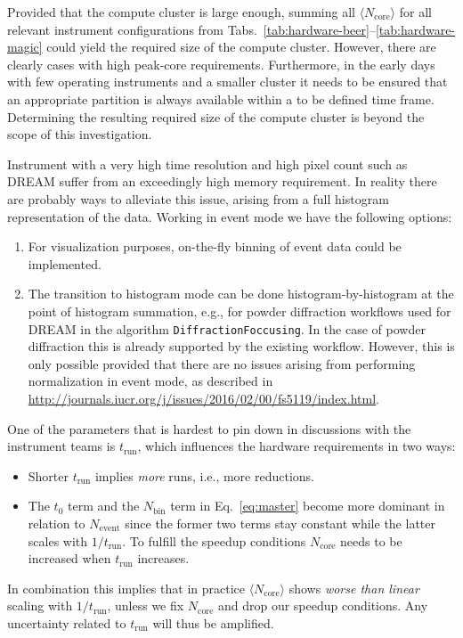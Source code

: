 \documentclass[a4paper,english,numbers=noenddot,bibliography=totoc,chapterprefix=on,DIV=12]{scrartcl}
\newcommand{\Trun}{t_{\text{run}}}
\newcommand{\Nbin}{N_{\text{bin}}}
\newcommand{\Ncore}{N_{\text{core}}}
\newcommand{\Ncoremean}{\langle N_{\text{core}}\rangle}
\newcommand{\Nevent}{N_{\text{event}}}
\newcommand{\dream}{DREAM\xspace}
\begin{document}
Provided that the compute cluster is large enough, summing all $\Ncoremean$ for all relevant instrument configurations from Tabs.~\ref{tab:hardware-beer}--\ref{tab:hardware-magic} could yield the required size of the compute cluster.
However, there are clearly cases with high peak-core requirements.
Furthermore, in the early days with few operating instruments and a smaller cluster it needs to be ensured that an appropriate partition is always available within a to be defined time frame.
Determining the resulting required size of the compute cluster is beyond the scope of this investigation.

Instrument with a very high time resolution and high pixel count such as \dream suffer from an exceedingly high memory requirement.
In reality there are probably ways to alleviate this issue, arising from a full histogram representation of the data.
Working in event mode we have the following options:
\begin{enumerate}
  \item For visualization purposes, on-the-fly binning of event data could be implemented.
  \item The transition to histogram mode can be done histogram-by-histogram at the point of histogram summation, e.g., for powder diffraction workflows used for \dream in the algorithm \verb|DiffractionFoccusing|.
    In the case of powder diffraction this is already supported by the existing workflow.
    However, this is only possible provided that there are no issues arising from performing normalization in event mode, as described in \url{http://journals.iucr.org/j/issues/2016/02/00/fs5119/index.html}.
\end{enumerate}

One of the parameters that is hardest to pin down in discussions with the instrument teams is $\Trun$, which influences the hardware requirements in two ways:
\begin{itemize}
  \item Shorter $\Trun$ implies \emph{more} runs, i.e., more reductions.
  \item The $t_0$ term and the $\Nbin$ term in Eq.~\eqref{eq:master} become more dominant in relation to $\Nevent$ since the former two terms stay constant while the latter scales with $1/\Trun$.
    To fulfill the speedup conditions $\Ncore$ needs to be increased when $\Trun$ increases.
\end{itemize}
In combination this implies that in practice $\Ncoremean$ shows \emph{worse than linear} scaling with $1/\Trun$, unless we fix $\Ncore$ and drop our speedup conditions.
Any uncertainty related to $\Trun$ will thus be amplified.
\end{document}
